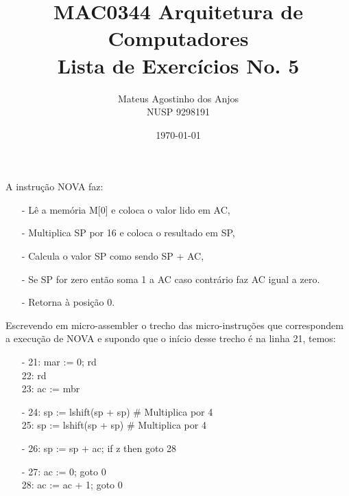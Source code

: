 \documentclass[12pt]{article}
\title{MAC0344 Arquitetura de Computadores\\
Lista de Exercícios No. 5
}
\author{Mateus Agostinho dos Anjos\\NUSP 9298191}
\date{\today}
\begin{document}
	\maketitle
    A instrução NOVA faz:
    \begin{itemize}
        \item[-]
            Lê a memória M[0] e coloca o valor lido em AC,
        \item[-]
            Multiplica SP por 16 e coloca o resultado em SP,
        \item[-]  
            Calcula o valor SP como sendo SP + AC,
        \item[-] 
            Se SP for zero então soma 1 a AC
            caso contrário faz AC igual a zero.
        \item[-]
            Retorna à posição 0.
    \end{itemize}

    Escrevendo em micro-assembler o trecho das micro-instruções que 
    correspondem a execução de NOVA e supondo que o início desse trecho é na 
    linha 21, temos:

    \begin{itemize}
        \item[-]
            21: mar := 0; rd\\
            22: rd\\
            23: ac := mbr\\
        \item[-]
            24: sp := lshift(sp + sp) \# Multiplica por 4\\
            25: sp := lshift(sp + sp) \# Multiplica por 4\\
        \item[-] 
            26: sp := sp + ac; if z then goto 28\\
        \item[-]
            27: ac := 0; goto 0\\
            28: ac := ac + 1; goto 0\\
    \end{itemize}
\end{document}
